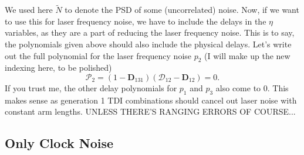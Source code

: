 \documentclass[11pt]{article}
\begin{document}
We used here $\tilde{N}$ to denote the PSD of some (uncorrelated) noise. Now, if we want to use this for laser frequency noise, we have to include the delays in the $\eta$ variables, as they are a part of reducing the laser frequency noise. This is to say, the polynomials given above should also include the physical delays. Let's write out the full polynomial for the laser frequency noise $p_2$ (I will make up the new indexing here, to be polished)
\begin{equation*}
    \mathcal{P}_{2} = (1-\mathbf{D}_{131})(\mathcal{D}_{12}-\mathbf{D}_{12})=0.
\end{equation*}
If you trust me, the other delay polynomials for $p_1$ and $p_3$ also come to 0. This makes sense as generation 1 TDI combinations should cancel out laser noise with constant arm lengths. UNLESS THERE'S RANGING ERRORS OF COURSE...

\subsection{Only Clock Noise}
\end{document}
